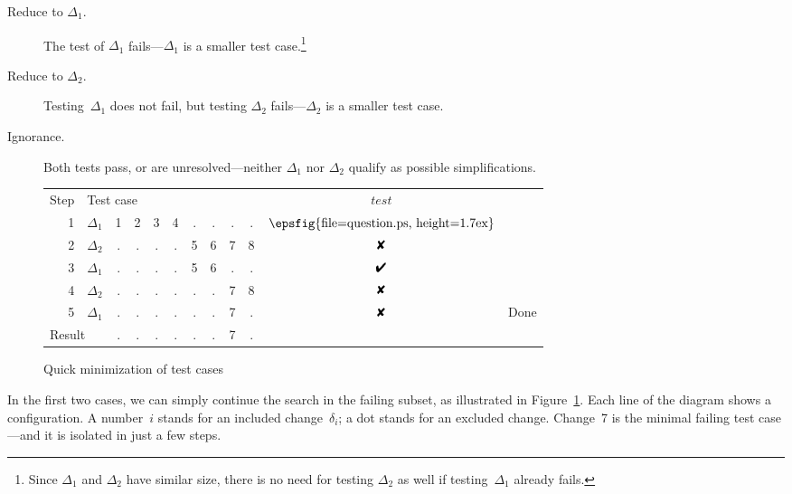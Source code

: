 \documentclass{acm_proc_article-sp}
\newcommand{\PASS}{\text{\ding{52}}\xspace}
\newcommand{\FAIL}{\text{\ding{56}}\xspace}
\newcommand{\UNRESOLVED}{\lower0.1ex\hbox{\epsfig{file=question.ps, 
      height=1.7ex}}}
\newcommand{\test}{\textit{test}\xspace}
\theoremstyle{plain}
\let\oldfootnote=\footnote
\renewcommand{\footnote}[1]{\oldfootnote{\let\small=\scriptsize #1}}
\begin{document}
\begin{description}
\item[Reduce to $\Delta_1$.] The test of $\Delta_1$ fails---$\Delta_1$ is a smaller
  test case.\footnote{Since $\Delta_1$ and $\Delta_2$ have similar size, there
    is no need for testing $\Delta_2$ as well if testing~$\Delta_1$ already fails.}
\item[Reduce to $\Delta_2$.] Testing~$\Delta_1$ does not fail, but testing $\Delta_2$
  fails---$\Delta_2$ is a smaller test case.
\item[Ignorance.] Both tests pass, or are unresolved---neither 
  $\Delta_1$ nor $\Delta_2$ qualify as possible simplifications.
\end{description}

\begin{figure}[t]
\begin{center}
\begin{tabular}{r|c|cccccccc|cl}
Step & \multicolumn{9}{l|}{Test case} & $\test$ \\
\cline{1-11}
     1 & $\Delta_1$ & 1 & 2 & 3 & 4 & . & . & . & . & $\UNRESOLVED$ \\
     2 & $\Delta_2$ & . & . & . & . & 5 & 6 & 7 & 8 & $\FAIL$ \\ \cline{1-11}
     3 & $\Delta_1$ & . & . & . & . & 5 & 6 & . & . & $\PASS$ \\
     4 & $\Delta_2$ & . & . & . & . & . & . & 7 & 8 & $\FAIL$ \\ \cline{1-11}
     5 & $\Delta_1$ & . & . & . & . & . & . & 7 & . & $\FAIL$ & Done \\
\cline{1-11}
    \multicolumn{2}{l|}{Result} & . & . & . & . & . & . & 7 & . & \\
\end{tabular}
\end{center}
\vspace{-0.25cm}
\caption{Quick minimization of test cases}
\label{fig:divide}
\end{figure}

\noindent
In the first two cases, we can simply continue the search in the
failing subset, as illustrated in Figure~\ref{fig:divide}.  Each line
of the diagram shows a configuration.  A number~$i$ stands for an
included change~$\delta_i$; a dot stands for an excluded change.  Change~7
is the minimal failing test case---and it is isolated in just a few
steps.
\end{document}
